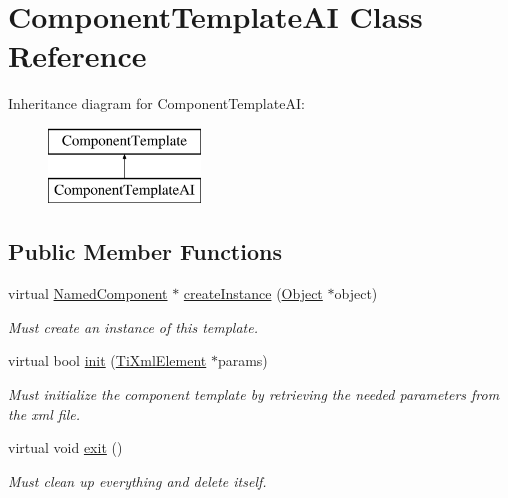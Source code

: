 \hypertarget{classComponentTemplateAI}{
\section{\-Component\-Template\-A\-I \-Class \-Reference}
\label{dc/d6b/classComponentTemplateAI}
}
\-Inheritance diagram for \-Component\-Template\-A\-I\-:\begin{figure}[H]
\begin{center}
\leavevmode
\includegraphics[height=2.000000cm]{dc/d6b/classComponentTemplateAI}
\end{center}
\end{figure}
\subsection*{\-Public \-Member \-Functions}
\begin{DoxyCompactItemize}
\item 
\hypertarget{classComponentTemplateAI_a3c817d3eb0570b1e4a9c7684f244aca4}{
virtual \hyperlink{classNamedComponent}{\-Named\-Component} $\ast$ \hyperlink{classComponentTemplateAI_a3c817d3eb0570b1e4a9c7684f244aca4}{create\-Instance} (\hyperlink{classObject}{\-Object} $\ast$object)}
\label{dc/d6b/classComponentTemplateAI_a3c817d3eb0570b1e4a9c7684f244aca4}

\begin{DoxyCompactList}\small\item\em \-Must create an instance of this template. \end{DoxyCompactList}\item 
\hypertarget{classComponentTemplateAI_ae2a4aa628d52f17f48696f36d7a38f01}{
virtual bool \hyperlink{classComponentTemplateAI_ae2a4aa628d52f17f48696f36d7a38f01}{init} (\hyperlink{classTiXmlElement}{\-Ti\-Xml\-Element} $\ast$params)}
\label{dc/d6b/classComponentTemplateAI_ae2a4aa628d52f17f48696f36d7a38f01}

\begin{DoxyCompactList}\small\item\em \-Must initialize the component template by retrieving the needed parameters from the xml file. \end{DoxyCompactList}\item 
\hypertarget{classComponentTemplateAI_a958320363d2d0ce4c8e0b63e06788895}{
virtual void \hyperlink{classComponentTemplateAI_a958320363d2d0ce4c8e0b63e06788895}{exit} ()}
\label{dc/d6b/classComponentTemplateAI_a958320363d2d0ce4c8e0b63e06788895}

\begin{DoxyCompactList}\small\item\em \-Must clean up everything and delete itself. \end{DoxyCompactList}\end{DoxyCompactItemize}
